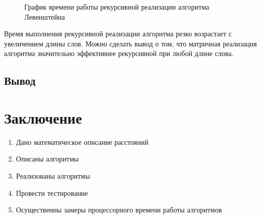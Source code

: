 \documentclass[12pt, a4paper]{report}
\begin{document}
	\begin{figure}[ht!]
		\caption{График времени работы рекурсивной реализации алгоритма Левенштейна}
	\end{figure}

	
 	Время выполнения рекурсивной реализации алгоритма резко возрастает с увеличением длины слов. Можно сделать вывод о том, что матричная реализация алгоритма значительно эффективнее рекурсивной при любой длине слова.

	\section{Вывод}
	
	\chapter*{Заключение}

	\begin{enumerate}
		\item Дано математическое описание расстояний
		\item Описаны алгоритмы
		\item Реализованы алгоритмы 
		\item Провести тестирование
		\item Осущественны замеры процессорного времени работы алгоритмов
	\end{enumerate}
	
\end{document}
